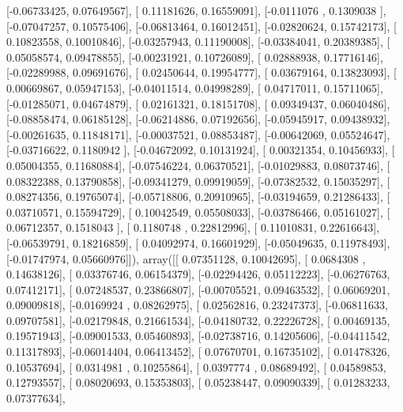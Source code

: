 \documentclass{article}
\begin{document}
       [-0.06733425,  0.07649567],
       [ 0.11181626,  0.16559091],
       [-0.0111076 ,  0.1309038 ],
       [-0.07047257,  0.10575406],
       [-0.06813464,  0.16012451],
       [-0.02820624,  0.15742173],
       [ 0.10823558,  0.10010846],
       [-0.03257943,  0.11190008],
       [-0.03384041,  0.20389385],
       [ 0.05058574,  0.09478855],
       [-0.00231921,  0.10726089],
       [ 0.02888938,  0.17716146],
       [-0.02289988,  0.09691676],
       [ 0.02450644,  0.19954777],
       [ 0.03679164,  0.13823093],
       [ 0.00669867,  0.05947153],
       [-0.04011514,  0.04998289],
       [ 0.04717011,  0.15711065],
       [-0.01285071,  0.04674879],
       [ 0.02161321,  0.18151708],
       [ 0.09349437,  0.06040486],
       [-0.08858474,  0.06185128],
       [-0.06214886,  0.07192656],
       [-0.05945917,  0.09438932],
       [-0.00261635,  0.11848171],
       [-0.00037521,  0.08853487],
       [-0.00642069,  0.05524647],
       [-0.03716622,  0.1180942 ],
       [-0.04672092,  0.10131924],
       [ 0.00321354,  0.10456933],
       [ 0.05004355,  0.11680884],
       [-0.07546224,  0.06370521],
       [-0.01029883,  0.08073746],
       [ 0.08322388,  0.13790858],
       [-0.09341279,  0.09919059],
       [-0.07382532,  0.15035297],
       [ 0.08274356,  0.19765074],
       [-0.05718806,  0.20910965],
       [-0.03194659,  0.21286433],
       [ 0.03710571,  0.15594729],
       [ 0.10042549,  0.05508033],
       [-0.03786466,  0.05161027],
       [ 0.06712357,  0.1518043 ],
       [ 0.1180748 ,  0.22812996],
       [ 0.11010831,  0.22616643],
       [-0.06539791,  0.18216859],
       [ 0.04092974,  0.16601929],
       [-0.05049635,  0.11978493],
       [-0.01747974,  0.05660976]]), array([[ 0.07351128,  0.10042695],
       [ 0.0684308 ,  0.14638126],
       [ 0.03376746,  0.06154379],
       [-0.02294426,  0.05112223],
       [-0.06276763,  0.07412171],
       [ 0.07248537,  0.23866807],
       [-0.00705521,  0.09463532],
       [ 0.06069201,  0.09009818],
       [-0.0169924 ,  0.08262975],
       [ 0.02562816,  0.23247373],
       [-0.06811633,  0.09707581],
       [-0.02179848,  0.21661534],
       [-0.04180732,  0.22226728],
       [ 0.00469135,  0.19571943],
       [-0.09001533,  0.05460893],
       [-0.02738716,  0.14205606],
       [-0.04411542,  0.11317893],
       [-0.06014404,  0.06413452],
       [ 0.07670701,  0.16735102],
       [ 0.01478326,  0.10537694],
       [ 0.0314981 ,  0.10255864],
       [ 0.0397774 ,  0.08689492],
       [ 0.04589853,  0.12793557],
       [ 0.08020693,  0.15353803],
       [ 0.05238447,  0.09090339],
       [ 0.01283233,  0.07377634],
\end{document}
